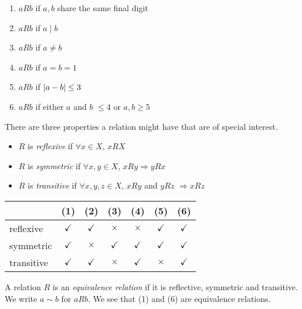 \documentclass{article}
\begin{document}
\begin{eg}\leavevmode
    \begin{enumerate}[label=(\arabic*)]
        \item $aRb$ if $a, b$ share the same final digit
        \item $aRb$ if $a \mid b$
        \item $aRb$ if $a \neq b$
        \item $aRb$ if $a = b = 1$
        \item $aRb$ if $\left\lvert a - b\right\rvert \leq 3$
        \item $aRb$ if either $a$ and $b$ $\leq 4$ or $a, b \geq 5$ 
    \end{enumerate}
\end{eg}
There are three properties a relation might have that are of special interest.
\begin{itemize}
    \item $R$ is \emph{reflexive} if $\forall x \in X$, $xRX$
    \item $R$ is \emph{symmetric} if $\forall x,y \in X$, $xRy \Rightarrow yRx$
    \item $R$ is \emph{transitive} if $\forall x,y,z \in X$, $xRy$ and $yRz$ $\Rightarrow xRz$
\end{itemize}

\begin{eg}\leavevmode
    \begin{center}
        \begin{tabular}{l|cccccc}
            & (1) & (2) & (3) & (4) & (5) & (6) \\
            \hline
            reflexive  & $\checkmark$ & $\checkmark$ & $\times$     & $\times$     & $\checkmark$ & $\checkmark$ \\
            symmetric  & $\checkmark$ & $\times$     & $\checkmark$ & $\checkmark$ & $\checkmark$ & $\checkmark$ \\
            transitive & $\checkmark$ & $\checkmark$ & $\times$     & $\checkmark$ & $\times$     & $\checkmark$
        \end{tabular}
    \end{center}
\end{eg}

\begin{defi}
    A relation $R$ is an \emph{equivalence relation} if it is reflective, symmetric and transitive.
    We write $a \sim b$ for $aRb$. 
    We see that (1) and (6) are equivalence relations.
\end{defi}
\end{document}
